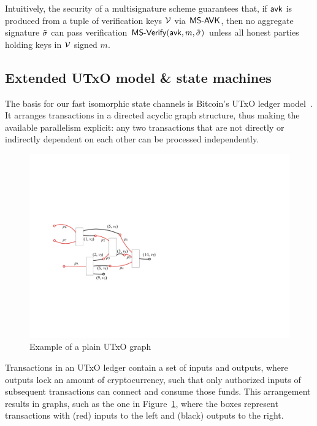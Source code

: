   Intuitively, the security of a multisignature scheme guarantees
  that, if $\mathsf{avk}$ is produced from a tuple of verification keys
  $\mathcal V$ via $\mathsf{MS\textsf{-}{}AVK}$, then no aggregate signature $\tilde \sigma$ can
  pass verification $\mathsf{MS\textsf{-}{}Verify}(\mathsf{avk},m,\tilde \sigma)$ unless all
  honest parties holding keys in $\mathcal V$ signed $m$.

\subsection{Extended UTxO model \& state machines}
\label{sec:prel_tx}

The basis for our fast isomorphic state channels is Bitcoin's UTxO ledger model~\cite{formal-model-of-bitcoin-transactions,Zahnentferner18-UTxO}. It arranges transactions in a directed acyclic graph structure, thus making the available parallelism explicit: any two transactions that are not directly or indirectly dependent on each other can be processed independently. 

\begin{figure}[t]
  \centering
  \includegraphics[scale=.2,width=\textwidth/2]{figures/utxo-graph.pdf}
  \caption{Example of a plain UTxO graph}
  \label{fig:utxo-graph}
\end{figure}
%
Transactions in an UTxO ledger contain a set of inputs and outputs, where outputs lock an amount of cryptocurrency, such that only authorized inputs of subsequent transactions can connect and consume those funds. This arrangement results in graphs, such as the one in Figure~\ref{fig:utxo-graph}, where the boxes represent transactions with (red) inputs to the left and (black) outputs to the right.

